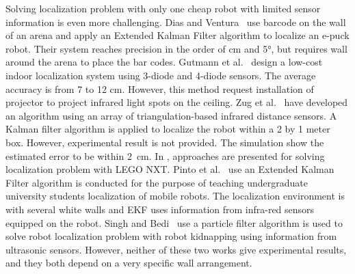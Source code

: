 \documentclass[letterpaper, 10pt, conference]{ieeeconf}
\begin{document}
Solving localization problem with only one cheap robot with limited sensor information is even more challenging.
Dias and Ventura~\cite{dias2013absolute} use barcode on the wall of an arena and apply an Extended Kalman Filter algorithm to localize an e-puck robot.
Their system reaches precision in the order of cm and 5°, but requires wall around the arena to place the bar codes.
Gutmann et al.~\cite{gutmann2013challenges} design a low-cost indoor localization system using 3-diode and 4-diode sensors. 
The average accuracy is from 7 to 12 cm.
However, this method request installation of projector to project infrared light spots on the ceiling.
Zug et al.~\cite{zug2011design} have developed an algorithm using an array of triangulation-based infrared distance sensors.
A Kalman filter algorithm is applied to localize the robot within a 2 by 1 meter box.  
However, experimental result is not provided. 
The simulation show the estimated error to be within 2\, cm. 
In \cite{pinto2012localization,singh2013map}, approaches are presented for solving localization problem with LEGO NXT.
Pinto et al.~\cite{pinto2012localization} use an Extended Kalman Filter algorithm is conducted for the purpose of teaching undergraduate university students localization of mobile robots.
The localization environment is with several white walls and EKF uses information from infra-red sensors equipped on the robot.
Singh and Bedi~\cite{singh2013map} use a particle filter algorithm is used to solve robot localization problem with robot kidnapping using information from ultrasonic sensors.
However, neither of these two works give experimental results, and they both depend on a very specific wall arrangement.
\end{document}
